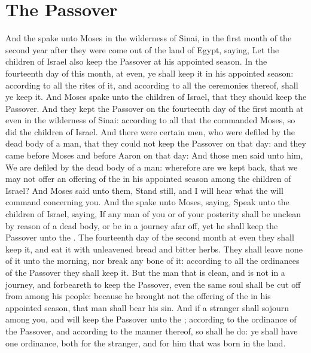 \section*{The Passover}
\begin{biblechapter} %
\verse And the \LORD spake unto Moses in the wilderness of Sinai, in the first month of the second year after they were come out of the land of Egypt, saying,
\verse Let the children of Israel also keep the Passover at his appointed season.
\verse In the fourteenth day of this month, at even, ye shall keep it in his appointed season: according to all the rites of it, and according to all the ceremonies thereof, shall ye keep it.
\verse And Moses spake unto the children of Israel, that they should keep the Passover.
\verse And they kept the Passover on the fourteenth day of the first month at even in the wilderness of Sinai: according to all that the \LORD commanded Moses, so did the children of Israel.
\verse And there were certain men, who were defiled by the dead body of a man, that they could not keep the Passover on that day: and they came before Moses and before Aaron on that day:
\verse And those men said unto him, We are defiled by the dead body of a man: wherefore are we kept back, that we may not offer an offering of the \LORD in his appointed season among the children of Israel?
\verse And Moses said unto them, Stand still, and I will hear what the \LORD will command concerning you.
\verse And the \LORD spake unto Moses, saying,
\verse Speak unto the children of Israel, saying, If any man of you or of your posterity shall be unclean by reason of a dead body, or be in a journey afar off, yet he shall keep the Passover unto the \LORD.
\verse The fourteenth day of the second month at even they shall keep it, and eat it with unleavened bread and bitter herbs.
\verse They shall leave none of it unto the morning, nor break any bone of it: according to all the ordinances of the Passover they shall keep it.
\verse But the man that is clean, and is not in a journey, and forbeareth to keep the Passover, even the same soul shall be cut off from among his people: because he brought not the offering of the \LORD in his appointed season, that man shall bear his sin.
\verse And if a stranger shall sojourn among you, and will keep the Passover unto the \LORD; according to the ordinance of the Passover, and according to the manner thereof, so shall he do: ye shall have one ordinance, both for the stranger, and for him that was born in the land.

\end{biblechapter}
